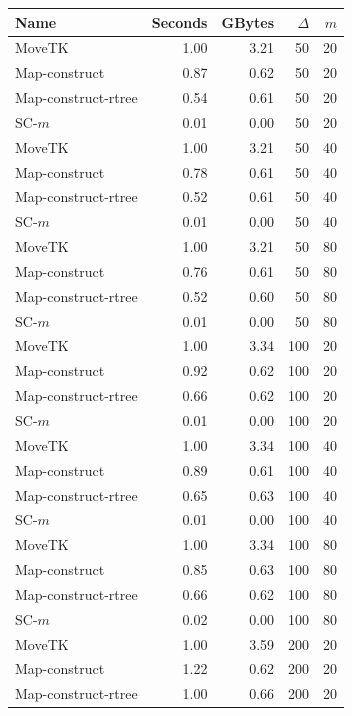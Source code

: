     \begin{figure} \begin{center}
    \begin{minipage}{0.5\textwidth}
    \begin{tabular}{@{}lrrrr@{}}        
        \toprule
        Name & Seconds & GBytes & $\Delta$ & $m$\\
        \midrule
        MoveTK & 1.00 & 3.21 & 50 & 20\\
Map-construct & 0.87 & 0.62 & 50 & 20\\
Map-construct-rtree & 0.54 & 0.61 & 50 & 20\\
        \medskip
SC-$m$ & 0.01 & 0.00 & 50 & 20\\
        MoveTK & 1.00 & 3.21 & 50 & 40\\
Map-construct & 0.78 & 0.61 & 50 & 40\\
Map-construct-rtree & 0.52 & 0.61 & 50 & 40\\
        \medskip
SC-$m$ & 0.01 & 0.00 & 50 & 40\\
        MoveTK & 1.00 & 3.21 & 50 & 80\\
Map-construct & 0.76 & 0.61 & 50 & 80\\
Map-construct-rtree & 0.52 & 0.60 & 50 & 80\\
        \medskip
SC-$m$ & 0.01 & 0.00 & 50 & 80\\
        MoveTK & 1.00 & 3.34 & 100 & 20\\
Map-construct & 0.92 & 0.62 & 100 & 20\\
Map-construct-rtree & 0.66 & 0.62 & 100 & 20\\
        \medskip
SC-$m$ & 0.01 & 0.00 & 100 & 20\\
        MoveTK & 1.00 & 3.34 & 100 & 40\\
Map-construct & 0.89 & 0.61 & 100 & 40\\
Map-construct-rtree & 0.65 & 0.63 & 100 & 40\\
        \medskip
SC-$m$ & 0.01 & 0.00 & 100 & 40\\
        MoveTK & 1.00 & 3.34 & 100 & 80\\
Map-construct & 0.85 & 0.63 & 100 & 80\\
Map-construct-rtree & 0.66 & 0.62 & 100 & 80\\
        \medskip
SC-$m$ & 0.02 & 0.00 & 100 & 80\\
        MoveTK & 1.00 & 3.59 & 200 & 20\\
Map-construct & 1.22 & 0.62 & 200 & 20\\
Map-construct-rtree & 1.00 & 0.66 & 200 & 20\\

\end{tabular}
\end{minipage}
\end{center}
\end{figure}
